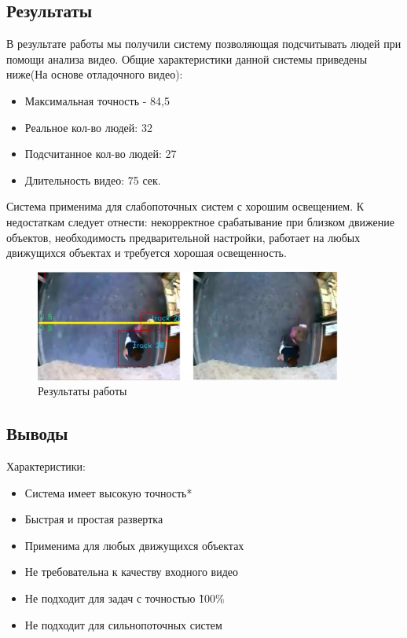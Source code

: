 \documentclass[12pt]{article}
\begin{document}
		\subsection{Результаты}
В результате работы мы получили систему позволяющая подсчитывать людей при помощи анализа видео. Общие характеристики данной системы приведены ниже(На основе отладочного видео):
\begin{itemize}
	\item Максимальная точность - 84,5%
	\item Реальное кол-во людей: 32
	\item Подсчитанное кол-во людей: 27
	\item Длительность видео: 75 сек.
\end{itemize}

Система применима для слабопоточных систем с хорошим освещением. К недостаткам следует отнести: некорректное срабатывание при близком движение объектов, необходимость предварительной настройки, работает на любых движущихся объектах и требуется хорошая освещенность. 

		\begin{figure}[h!]
			\centering
			\includegraphics[width=0.9\textwidth]{pic/result.jpg}
			\caption{Результаты работы}
		\end{figure}


\newpage
\subsection{Выводы}

Характеристики:
\begin{itemize}
	\item Система имеет высокую точность*
	\item Быстрая и простая развертка
	\item Применима для любых движущихся объектах
	\item Не требовательна к качеству входного видео
	\item Не подходит для задач с точностью \~ 100\%
	\item Не подходит для сильнопоточных систем 
\end{itemize}
\end{document}
